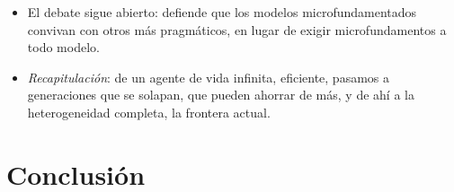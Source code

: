 \documentclass[11pt]{article}
\begin{document}
\begin{itemize}
\begin{itemize}
  \item \emph{modelos basados en agentes}: simulaciones de muchos agentes que siguen reglas observadas, sin suponer equilibrio ni racionalidad plena; generan crisis endógenas, pero cuesta entender el mecanismo;
  \item \emph{conocimiento imperfecto}\nocite{FrydmanGoldberg2007Imperfect} y \emph{macroeconomía del comportamiento}\nocite{DeGrauwe2012Lectures}: agentes que no conocen el modelo verdadero y forman expectativas con reglas sencillas, de abajo arriba.
  \end{itemize}
\item El debate sigue abierto: \textcite{WrenLewis2018Ending} defiende que los modelos microfundamentados convivan con otros más pragmáticos, en lugar de exigir microfundamentos a todo modelo.
\item \emph{Recapitulación}: de un agente de vida infinita, eficiente, pasamos a generaciones que se solapan, que pueden ahorrar de más, y de ahí a la heterogeneidad completa, la frontera actual.
\end{itemize}

\section*{Conclusión}
\end{document}
